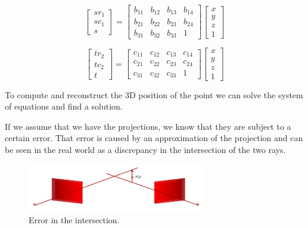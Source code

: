 \begin{multicols}{2}

    \[
        \begin{bmatrix}
            sr_1 \\
            sc_1 \\
            s
        \end{bmatrix}  
        =
        \begin{bmatrix}
            b_{11} & b_{12} & b_{13} & b_{14} \\
            b_{21} & b_{22} & b_{23} & b_{24} \\
            b_{31} & b_{32} & b_{33} & 1
        \end{bmatrix}
        \begin{bmatrix}
            x \\
            y \\
            z \\
            1
        \end{bmatrix}
    \]

    \[
        \begin{bmatrix}
            tr_2 \\
            tc_2 \\
            t
        \end{bmatrix}  
        =
        \begin{bmatrix}
            c_{11} & c_{12} & c_{13} & c_{14} \\
            c_{21} & c_{22} & c_{23} & c_{24} \\
            c_{31} & c_{32} & c_{33} & 1
        \end{bmatrix}
        \begin{bmatrix}
            x \\
            y \\
            z \\
            1
        \end{bmatrix}
    \]
\end{multicols}

To compute and reconstruct the 3D position of the point we can solve the system of equations and find a solution.

If we assume that we have the projections, we know that they are subject to a certain error. That error is caused by an approximation of the projection and can be seen in the real world as a discrepancy in the intersection of the two rays.


\begin{figure}[H]
    \centering
    \includegraphics[width=0.7\textwidth]{Figures/inter.png}
    \caption{Error in the intersection.}
    \label{fig:inter}
\end{figure}

